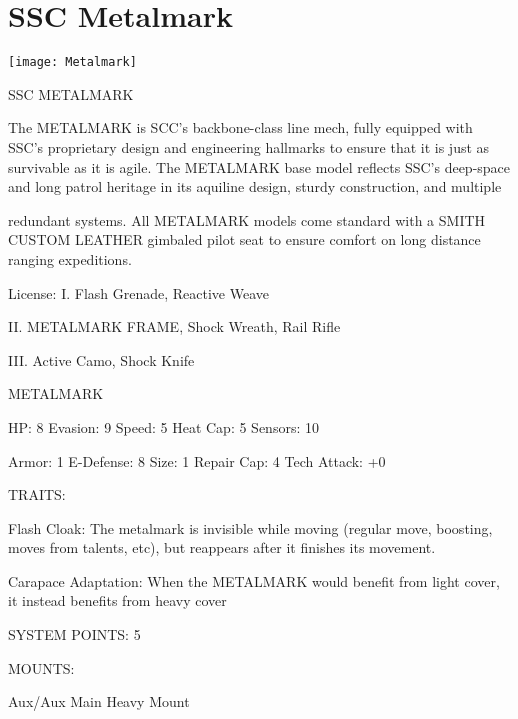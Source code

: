
\section{SSC Metalmark}

\begin{center}
    \texttt{[image: Metalmark]}
\end{center}

                                             SSC METALMARK

The METALMARK is SCC’s backbone-class line mech, fully equipped with SSC’s proprietary design and
engineering hallmarks to ensure that it is just as survivable as it is agile. The METALMARK base model
reflects SSC’s deep-space and long patrol heritage in its aquiline design, sturdy construction, and multiple

redundant systems. All METALMARK models come standard with a SMITH CUSTOM LEATHER gimbaled
pilot seat to ensure comfort on long distance ranging expeditions.




                                                     License:
 I. Flash Grenade, Reactive Weave

 II. METALMARK FRAME, Shock Wreath, Rail Rifle

 III. Active Camo, Shock Knife


                                                METALMARK

  HP: 8          Evasion: 9                             Speed: 5            Heat Cap: 5         Sensors: 10

 Armor: 1        E-Defense: 8                           Size: 1             Repair Cap: 4       Tech Attack:
                                                                                                +0

                                                     TRAITS:

  Flash Cloak: The metalmark is invisible while moving (regular move, boosting, moves from talents, etc),
  but reappears after it finishes its movement.

  Carapace Adaptation: When the METALMARK would benefit from light cover, it instead benefits from
  heavy cover

                                              SYSTEM POINTS: 5

                                                    MOUNTS:

 Aux/Aux                             Main                                   Heavy Mount

